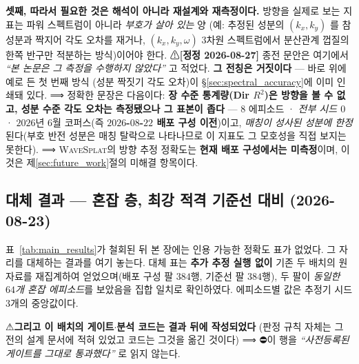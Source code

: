 \documentclass[11pt]{report}
\numberwithin{equation}{chapter}
\numberwithin{figure}{chapter}
\numberwithin{table}{chapter}
\newcommand{\WS}{\textsc{WaveSplat}}
\begin{document}
\textbf{셋째, 따라서 필요한 것은 해석이 아니라 재설계와 재측정이다.}
방향을 실제로 보는 지표는 파워 스펙트럼이 아니라 \emph{부호가 살아 있는} 양
(예: 추정된 성분의 $(k_x,k_y)$ 를 참 성분과 짝지어 각도 오차를 재거나,
$(k_x,k_y,\omega)$ 3차원 스펙트럼에서 분산관계 껍질의 한쪽 반구만 적분하는 방식)이어야
한다. ⚠\textbf{[정정 2026-08-27]} 종전 문안은 여기에서 \emph{``본 논문은 그 측정을
수행하지 않았다''} 고 적었다. \textbf{그 전칭은 거짓이다} --- 바로 위에 예로 든 첫 번째 방식
(성분 짝짓기 각도 오차)이 \S\ref{sec:spectral_accuracy}에 이미 인쇄돼 있다.
⟹ 정확한 문장은 다음이다: \textbf{장 수준 통계량(Dir $R^2$)은 방향을 볼 수 없고,
성분 수준 각도 오차는 측정됐으나 그 표본이 좁다} --- $8$ 에피소드 · \emph{전부 시드 $0$} ·
$2026$년 $6$월 코퍼스(즉 \textbf{$2026$-$08$-$22$ 배포 구성 이전})이고,
\emph{매칭이 성사된 성분에 한정}된다(부호 반전 성분은 매칭 탈락으로 나타나므로
이 지표도 그 모호성을 직접 보지는 못한다).
⟹ \WS{}의 방향 추정 정확도는 \textbf{현재 배포 구성에서는 미측정}이며,
이것은 제\ref{sec:future_work}절의 미해결 항목이다.

\subsection{대체 결과 --- 혼잡 층, 최강 적격 기준선 대비 (2026-08-23)}
\label{sec:results_b1}


표~\ref{tab:main_results}가 철회된 뒤 본 장에는 인용 가능한 정확도 표가 없었다.
그 자리를 대체하는 결과를 여기 놓는다. 대체 표는 \textbf{추가 추정 실행 없이} 기존 두 배치의
원자료를 재집계하여 얻었으며(배포 구성 팔 $384$행, 기준선 팔 $384$행), 두 팔이 \emph{동일한
$64$개 혼잡 에피소드}를 보았음을 집합 일치로 확인하였다. 에피소드별 값은 추정기 시드 $3$개의
 중앙값이다.

⚠\textbf{그리고 이 배치의 게이트$\cdot$분석 코드는 결과 뒤에 작성되었다}
(판정 규칙 자체는 그 전의 설계 문서에 적혀 있었고 코드는 그것을 옮긴 것이다)
⟹ ⛔이 행을 \emph{``사전등록된 게이트를 그대로 통과했다''} 로 읽지 않는다.
\end{document}
